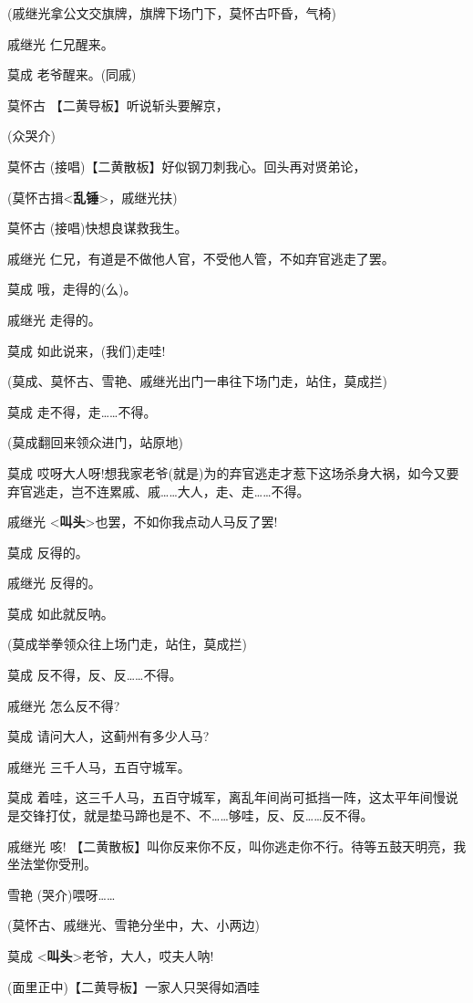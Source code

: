(戚继光拿公文交旗牌，旗牌下场门下，莫怀古吓昏，气椅)

戚继光 仁兄醒来。

莫成 老爷醒来。(同戚)

莫怀古 【二黄导板】听说斩头要解京，

(众哭介)

莫怀古 (接唱)【二黄散板】好似钢刀刺我心。回头再对贤弟论，

(莫怀古揖\textless{}\textbf{乱锤}\textgreater{}，戚继光扶)

莫怀古 (接唱)快想良谋救我生。

戚继光 仁兄，有道是不做他人官，不受他人管，不如弃官逃走了罢。

莫成 哦，走得的(么)。

戚继光 走得的。

莫成 如此说来，(我们)走哇!

(莫成、莫怀古、雪艳、戚继光出门一串往下场门走，站住，莫成拦)

莫成 走不得，走\ldots{}\ldots{}不得。

(莫成翻回来领众进门，站原地)

莫成
哎呀大人呀!想我家老爷(就是)为的弃官逃走才惹下这场杀身大祸，如今又要弃官逃走，岂不连累戚、戚\ldots{}\ldots{}大人，走、走\ldots{}\ldots{}不得。

戚继光
\textless{}\textbf{叫头}\textgreater{}也罢，不如你我点动人马反了罢!

莫成 反得的。

戚继光 反得的。

莫成 如此就反呐。

(莫成举拳领众往上场门走，站住，莫成拦)

莫成 反不得，反、反\ldots{}\ldots{}不得。

戚继光 怎么反不得?

莫成 请问大人，这蓟州有多少人马?

戚继光 三千人马，五百守城军。

莫成
着哇，这三千人马，五百守城军，离乱年间尚可抵挡一阵，这太平年间慢说是交锋打仗，就是垫马蹄也是不、不\ldots{}\ldots{}够哇，反、反\ldots{}\ldots{}反不得。

戚继光 咳!
【二黄散板】叫你反来你不反，叫你逃走你不行。待等五鼓天明亮，我坐法堂你受刑。

雪艳 (哭介)喂呀\ldots{}\ldots{}

(莫怀古、戚继光、雪艳分坐中，大、小两边)

莫成 \textless{}\textbf{叫头}\textgreater{}老爷，大人，哎夫人呐!

(面里正中)【二黄导板】一家人只哭得如酒哇

